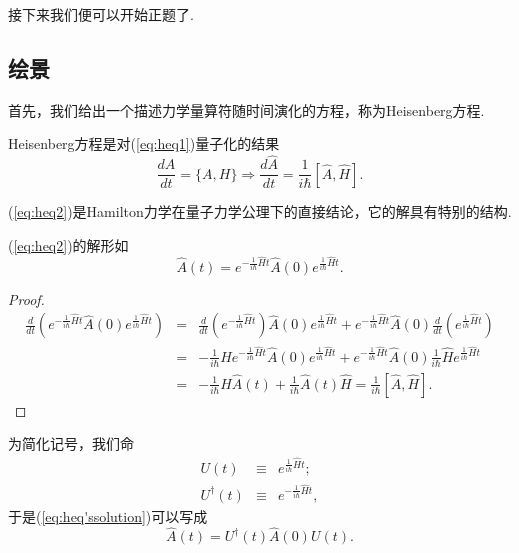     接下来我们便可以开始正题了.
    \subsection{绘景}
        首先，我们给出一个描述力学量算符随时间演化的方程，称为Heisenberg方程.
        \begin{definition}Heisenberg方程是对(\ref{eq:heq1})量子化的结果
            \begin{equation}\label{eq:heq2}
                \frac{dA}{dt}=\{A,H\}\Rightarrow\frac{d\hat{A}}{dt}=\frac{1}{i\hbar}[\hat{A},\hat{H}].
            \end{equation}
        \end{definition}
        (\ref{eq:heq2})是Hamilton力学在量子力学公理下的直接结论，它的解具有特别的结构.
        \begin{lemma}
            (\ref{eq:heq2})的解形如
            \begin{equation}\label{eq:heq'ssolution}
                \hat{A}(t)=e^{-\frac{1}{i\hbar}\hat{H}t}\hat{A}(0)e^{\frac{1}{i\hbar}\hat{H}t}.
            \end{equation}
            
        \end{lemma}
        \begin{proof}
            \begin{eqnarray*}
                \frac{d}{d t}\left(e^{-\frac{1}{i \hbar} \hat{H} t} \hat{A}(0) e^{\frac{1}{i \hbar} \hat{H} t}\right)&=&\frac{d}{d t}\left(e^{-\frac{1}{i \hbar}\hat{H} t}\right)\hat{A}(0) e^{\frac{1}{i \hbar} \hat{H} t}+e^{-\frac{1}{i \hbar} \hat{H} t} \hat{A}(0) \frac{d}{d t}\left(e^{\frac{1}{i \hbar} \hat{H} t}\right)\\
                &=&-\frac{1}{i \hbar} \hat{H} e^{-\frac{1}{i \hbar} \hat{H} t} \hat{A}(0) e^{\frac{1}{i \hbar} \hat{H} t}+e^{-\frac{1}{i \hbar} \hat{H} t} \hat{A}(0) \frac{1}{i \hbar} \hat{H} e^{\frac{1}{i \hbar} \hat{H} t} \\
                &=&-\frac{1}{i \hbar} \hat{H} \hat{A}(t)+\frac{1}{i \hbar} \hat{A}(t) \hat{H}=\frac{1}{i \hbar}[\hat{A}, \hat{H}].
            \end{eqnarray*}
        \end{proof}
        \begin{remark}
            为简化记号，我们命
        \begin{eqnarray*}
            U(t)&\equiv&e^{\frac{1}{i \hbar} \hat{H} t};\\
            U^\dagger (t)&\equiv&e^{-\frac{1}{i \hbar} \hat{H} t},
        \end{eqnarray*}
        于是(\ref{eq:heq'ssolution})可以写成
        \begin{equation}\label{eq:heq'ssolution2}
            \hat{A}(t)=U^\dagger(t)\hat{A}(0)U(t).
        \end{equation}
        \end{remark}
        
